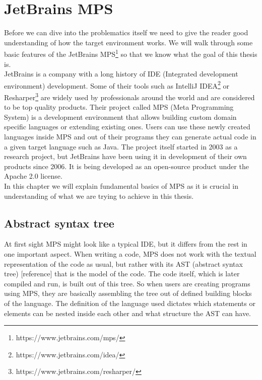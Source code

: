 \chapter{JetBrains MPS}

Before we can dive into the problematics itself we need to give the reader good understanding of how the target environment works. We will walk through some basic features of the JetBrains MPS\footnote{https://www.jetbrains.com/mps/} so that we know what the goal of this thesis is.
\\

JetBrains is a company with a long history of IDE (Integrated development environment) development. Some of their tools such as IntelliJ IDEA\footnote{https://www.jetbrains.com/idea/} or Resharper\footnote{https://www.jetbrains.com/resharper/} are widely used by professionals around the world and are considered to be top quality products. Their project called MPS (Meta Programming System) is a development environment that allows building custom domain specific languages or extending existing ones. Users can use these newly created languages inside MPS and out of their programs they can generate actual code in a given target language such as Java. The project itself started in 2003 as a research project, but JetBrains have been using it in development of their own products since 2006. It is being developed as an open-source product under the Apache 2.0 license.
\\

In this chapter we will explain fundamental basics of MPS as it is crucial in understanding of what we are trying to achieve in this thesis.

\section{Abstract syntax tree}
At first sight MPS might look like a typical IDE, but it differs from the rest in one important aspect. When writing a code, MPS does not work with the textual representation of the code as usual, but rather with its AST (abstract syntax tree) [reference] that is the model of the code. The code itself, which is later compiled and run, is built out of this tree. So when users are creating programs using MPS, they are basically assembling the tree out of defined building blocks of the language. The definition of the language used dictates which statements or elements can be nested inside each other and what structure the AST can have. 
\\

